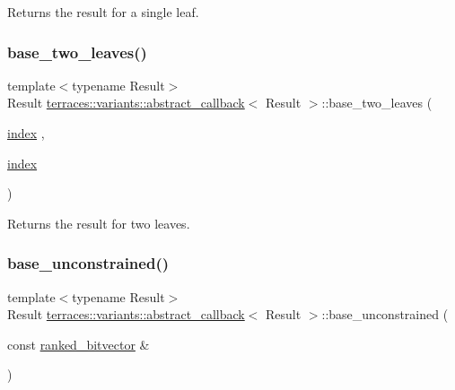 Returns the result for a single leaf. \mbox{\label{classterraces_1_1variants_1_1abstract__callback_ab252330b1c41618075dee4dbc4a6284a}} 
\subsubsection{\texorpdfstring{base\+\_\+two\+\_\+leaves()}{base\_two\_leaves()}}
{\footnotesize\ttfamily template$<$typename Result$>$ \\
Result \hyperlink{classterraces_1_1variants_1_1abstract__callback}{terraces\+::variants\+::abstract\+\_\+callback}$<$ Result $>$\+::base\+\_\+two\+\_\+leaves (\begin{DoxyParamCaption}\item[{\hyperlink{namespaceterraces_adbc33ccb543d1634e96d0eb02e472c77}{index}}]{,  }\item[{\hyperlink{namespaceterraces_adbc33ccb543d1634e96d0eb02e472c77}{index}}]{ }\end{DoxyParamCaption})}

Returns the result for two leaves. \mbox{\label{classterraces_1_1variants_1_1abstract__callback_ab067313cb90b076ac0e96bb4a10637bd}} 
\subsubsection{\texorpdfstring{base\+\_\+unconstrained()}{base\_unconstrained()}}
{\footnotesize\ttfamily template$<$typename Result$>$ \\
Result \hyperlink{classterraces_1_1variants_1_1abstract__callback}{terraces\+::variants\+::abstract\+\_\+callback}$<$ Result $>$\+::base\+\_\+unconstrained (\begin{DoxyParamCaption}\item[{const \hyperlink{namespaceterraces_acc45ec9c561024c50ecbce5b6738ba08}{ranked\+\_\+bitvector} \&}]{ }\end{DoxyParamCaption})}

